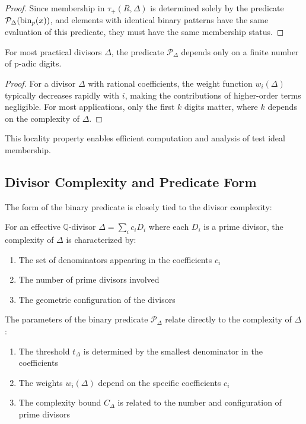 \begin{proof}
Since membership in $\tau_+(R,\Delta)$ is determined solely by the predicate $\mathcal{P}_\Delta(\operatorname{bin}_p(x))$, and elements with identical binary patterns have the same evaluation of this predicate, they must have the same membership status.
\end{proof}

\begin{proposition}\label{prop:locality}
For most practical divisors $\Delta$, the predicate $\mathcal{P}_\Delta$ depends only on a finite number of p-adic digits.
\end{proposition}

\begin{proof}
For a divisor $\Delta$ with rational coefficients, the weight function $w_i(\Delta)$ typically decreases rapidly with $i$, making the contributions of higher-order terms negligible. For most applications, only the first $k$ digits matter, where $k$ depends on the complexity of $\Delta$.
\end{proof}

This locality property enables efficient computation and analysis of test ideal membership.

\subsection{Divisor Complexity and Predicate Form}

The form of the binary predicate is closely tied to the divisor complexity:

\begin{definition}\label{def:divisor-complexity}
For an effective $\mathbb{Q}$-divisor $\Delta = \sum_i c_i D_i$ where each $D_i$ is a prime divisor, the complexity of $\Delta$ is characterized by:
\begin{enumerate}
    \item The set of denominators appearing in the coefficients $c_i$
    \item The number of prime divisors involved
    \item The geometric configuration of the divisors
\end{enumerate}
\end{definition}

\begin{proposition}\label{prop:complexity-predicate}
The parameters of the binary predicate $\mathcal{P}_\Delta$ relate directly to the complexity of $\Delta$:
\begin{enumerate}
    \item The threshold $t_\Delta$ is determined by the smallest denominator in the coefficients
    \item The weights $w_i(\Delta)$ depend on the specific coefficients $c_i$
    \item The complexity bound $C_\Delta$ is related to the number and configuration of prime divisors
\end{enumerate}
\end{proposition}

